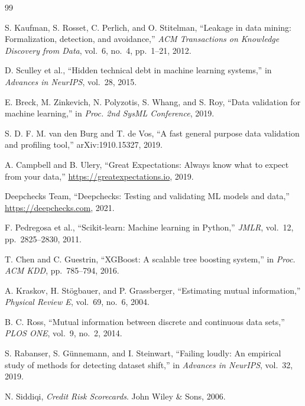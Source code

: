 \documentclass[11pt]{article}
\begin{document}

\begin{thebibliography}{99}

S. Kaufman, S. Rosset, C. Perlich, and O. Stitelman,
``Leakage in data mining: Formalization, detection, and avoidance,''
\textit{ACM Transactions on Knowledge Discovery from Data}, vol.~6, no.~4,
pp.~1--21, 2012.

D. Sculley et al.,
``Hidden technical debt in machine learning systems,''
in \textit{Advances in NeurIPS}, vol.~28, 2015.

E. Breck, M. Zinkevich, N. Polyzotis, S. Whang, and S. Roy,
``Data validation for machine learning,''
in \textit{Proc. 2nd SysML Conference}, 2019.

S. D. F. M. van den Burg and T. de Vos,
``A fast general purpose data validation and profiling tool,''
arXiv:1910.15327, 2019.

A. Campbell and B. Ulery,
``Great Expectations: Always know what to expect from your data,''
\url{https://greatexpectations.io}, 2019.

Deepchecks Team,
``Deepchecks: Testing and validating ML models and data,''
\url{https://deepchecks.com}, 2021.

F. Pedregosa et al.,
``Scikit-learn: Machine learning in Python,''
\textit{JMLR}, vol.~12, pp.~2825--2830, 2011.

T. Chen and C. Guestrin,
``XGBoost: A scalable tree boosting system,''
in \textit{Proc. ACM KDD}, pp.~785--794, 2016.

A. Kraskov, H. St\"{o}gbauer, and P. Grassberger,
``Estimating mutual information,''
\textit{Physical Review E}, vol.~69, no.~6, 2004.

B. C. Ross,
``Mutual information between discrete and continuous data sets,''
\textit{PLOS ONE}, vol.~9, no.~2, 2014.

S. Rabanser, S. G\"{u}nnemann, and I. Steinwart,
``Failing loudly: An empirical study of methods for detecting dataset shift,''
in \textit{Advances in NeurIPS}, vol.~32, 2019.

N. Siddiqi,
\textit{Credit Risk Scorecards}.
John Wiley \& Sons, 2006.


\end{thebibliography}
\end{document}
